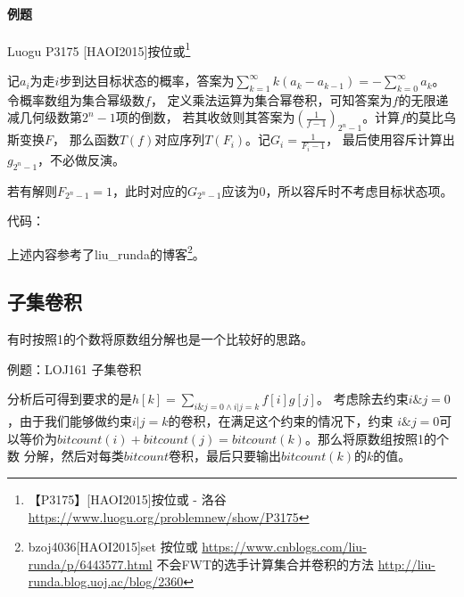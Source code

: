\paragraph{例题}
Luogu P3175 [HAOI2015]按位或\footnote{
    【P3175】[HAOI2015]按位或 - 洛谷
    \url{https://www.luogu.org/problemnew/show/P3175}
}

记$a_i$为走$i$步到达目标状态的概率，答案为$\displaystyle \sum_{k=1}^
\infty{k(a_k-a_{k-1})}=-\sum_{k=0}^\infty a_k$。令概率数组为集合幂级数$f$，
定义乘法运算为集合幂卷积，可知答案为$f$的无限递减几何级数第$2^n-1$项的倒数，
若其收敛则其答案为$\left(\frac{1}{f-1}\right)_{2^n-1}$。计算$f$的莫比乌斯变换$F$，
那么函数$T(f)$对应序列${T(F_i)}$。记$G_i={\frac{1}{F_i-1}}$，
最后使用容斥计算出$g_{2^n-1}$，不必做反演。

若有解则$F_{2^n-1}=1$，此时对应的$G_{2^n-1}$应该为0，所以容斥时不考虑目标状态项。

代码：


上述内容参考了liu\_runda的博客\footnote{
    bzoj4036[HAOI2015]set 按位或
    \url{https://www.cnblogs.com/liu-runda/p/6443577.html}
    不会FWT的选手计算集合并卷积的方法
    \url{http://liu-runda.blog.uoj.ac/blog/2360}
}。

\subsection{子集卷积}
有时按照1的个数将原数组分解也是一个比较好的思路。

例题：LOJ161 子集卷积

分析后可得到要求的是$h[k]=\displaystyle \sum_{i\&j=0 \land i|j=k}{f[i]g[j]}$。
考虑除去约束$i\&j=0$，由于我们能够做约束$i|j=k$的卷积，在满足这个约束的情况下，约束
$i\&j=0$可以等价为$bitcount(i)+bitcount(j)=bitcount(k)$。那么将原数组按照1的个数
分解，然后对每类$bitcount$卷积，最后只要输出$bitcount(k)$的$k$的值。
